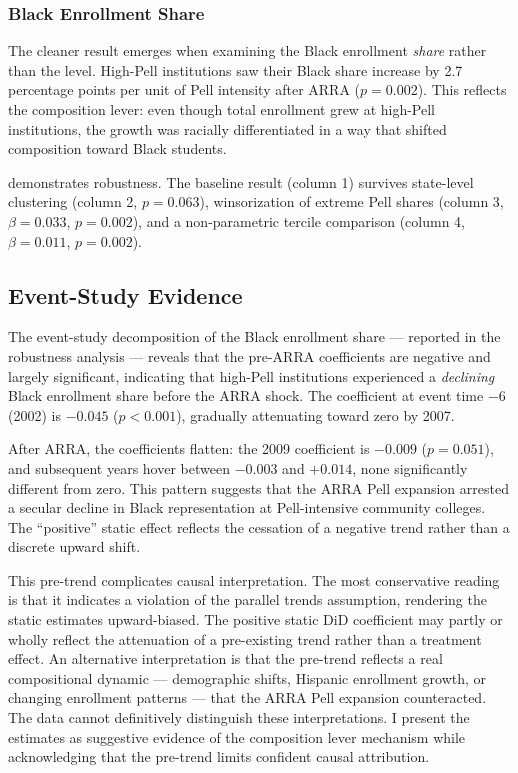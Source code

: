 \documentclass[12pt]{article}
\begin{document}
\subsubsection*{Black Enrollment Share} The cleaner result emerges when examining the Black enrollment \textit{share} rather than the level. High-Pell institutions saw their Black share increase by 2.7 percentage points per unit of Pell intensity after ARRA ($p = 0.002$). This reflects the composition lever: even though total enrollment grew at high-Pell institutions, the growth was racially differentiated in a way that shifted composition toward Black students.



 demonstrates robustness. The baseline result (column 1) survives state-level clustering (column 2, $p = 0.063$), winsorization of extreme Pell shares (column 3, $\beta = 0.033$, $p = 0.002$), and a non-parametric tercile comparison (column 4, $\beta = 0.011$, $p = 0.002$).

\subsection{Event-Study Evidence}

The event-study decomposition of the Black enrollment share --- reported in the robustness analysis --- reveals that the pre-ARRA coefficients are negative and largely significant, indicating that high-Pell institutions experienced a \textit{declining} Black enrollment share before the ARRA shock. The coefficient at event time $-6$ (2002) is $-0.045$ ($p < 0.001$), gradually attenuating toward zero by 2007.

After ARRA, the coefficients flatten: the 2009 coefficient is $-0.009$ ($p = 0.051$), and subsequent years hover between $-0.003$ and $+0.014$, none significantly different from zero. This pattern suggests that the ARRA Pell expansion arrested a secular decline in Black representation at Pell-intensive community colleges. The ``positive'' static effect reflects the cessation of a negative trend rather than a discrete upward shift.

This pre-trend complicates causal interpretation. The most conservative reading is that it indicates a violation of the parallel trends assumption, rendering the static estimates upward-biased. The positive static DiD coefficient may partly or wholly reflect the attenuation of a pre-existing trend rather than a treatment effect. An alternative interpretation is that the pre-trend reflects a real compositional dynamic --- demographic shifts, Hispanic enrollment growth, or changing enrollment patterns --- that the ARRA Pell expansion counteracted. The data cannot definitively distinguish these interpretations. I present the estimates as suggestive evidence of the composition lever mechanism while acknowledging that the pre-trend limits confident causal attribution.
\end{document}
